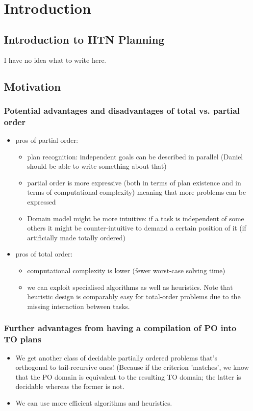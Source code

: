 \chapter{Introduction}

\section{Introduction to HTN Planning}
I have no idea what to write here.

\section{Motivation}
\subsection{Potential advantages and disadvantages of total vs. partial order}
\begin{itemize}
	\item pros of partial order:
	\begin{itemize}
		\item plan recognition: independent goals can be described in parallel (Daniel should be able to write something about that)
		\item partial order is more expressive (both in terms of plan existence and in terms of computational complexity) meaning that more problems can be expressed
		\item Domain model might be more intuitive: if a task is independent of some others it might be counter-intuitive to demand a certain position of it (if artificially made totally ordered)
	\end{itemize}

   \item pros of total order:
    \begin{itemize}
   		\item computational complexity is lower (fewer worst-case solving time)
        \item we can exploit specialised algorithms as well as heuristics. Note that heuristic design is comparably easy for total-order problems due to the missing interaction between tasks.
   	\end{itemize}
\end{itemize}


\subsection{Further advantages from having a compilation of PO into TO plans}
\begin{itemize}
	\item We get another class of decidable partially ordered problems that's orthogonal to tail-recursive ones! (Because if the criterion 'matches', we know that the PO domain is equivalent to the resulting TO domain; the latter is decidable whereas the former is not.
	\item We can use more efficient algorithms and heuristics. 
\end{itemize}

